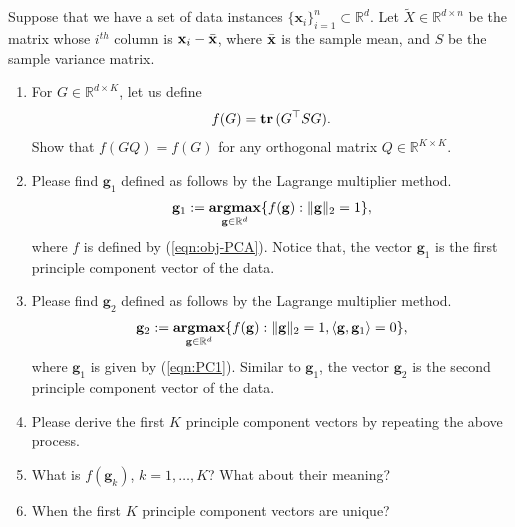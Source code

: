 \documentclass[11pt,letter,notitlepage]{article}
\DeclareMathOperator*{\argmax}{\bf argmax}
\DeclareMathOperator*{\tr}{\bf tr\,}
\begin{document}
\begin{exercise}
    Suppose that we have a set of data instances $\{\mathbf{x}_i\}_{i=1}^n\subset\mathbb{R}^d$. Let $\widetilde{X}\in\mathbb{R}^{d\times n}$ be the matrix whose $i^{th}$ column is $\mathbf{x}_i-\Bar{\mathbf{x}}$, where $\Bar{\mathbf{x}}$ is the sample mean, and $S$ be the sample variance matrix.

    \begin{enumerate}
        \item For $G\in\mathbb{R}^{d\times K}$, let us define
              \begin{align}\label{eqn:obj-PCA}
                  f(G) = \tr(G^{\top}SG).
              \end{align}
              Show that $f(GQ)=f(G)$ for any orthogonal matrix $Q\in\mathbb{R}^{K\times K}$.

        \item Please find $\mathbf{g}_1$ defined as follows by the Lagrange multiplier method.
              \begin{align}\label{eqn:PC1}
                  \mathbf{g}_1:=\argmax_{\mathbf{g}\in\mathbb{R}^d}\{f(\mathbf{g}):\|\mathbf{g}\|_2=1\},
              \end{align}
              where $f$ is defined by (\ref{eqn:obj-PCA}). Notice that, the vector $\mathbf{g}_1$ is the first principle component vector of the data.

        \item Please find $\mathbf{g}_2$ defined as follows by the Lagrange multiplier method.
              \begin{align*}
                  \mathbf{g}_2:=\argmax_{\mathbf{g}\in\mathbb{R}^d}\{f(\mathbf{g}):\|\mathbf{g}\|_2=1,\langle\mathbf{g},\mathbf{g}_1\rangle=0\},
              \end{align*}
              where $\mathbf{g}_1$ is given by (\ref{eqn:PC1}). Similar to $\mathbf{g}_1$, the vector $\mathbf{g}_2$ is the second principle component vector of the data.

        \item Please derive the first $K$ principle component vectors by repeating the above process.

        \item What is $f(\mathbf{g}_k)$, $k=1,\ldots,K$? What about their meaning?

        \item When the first $K$ principle component vectors are unique?
    \end{enumerate}

\end{exercise}
\end{document}

